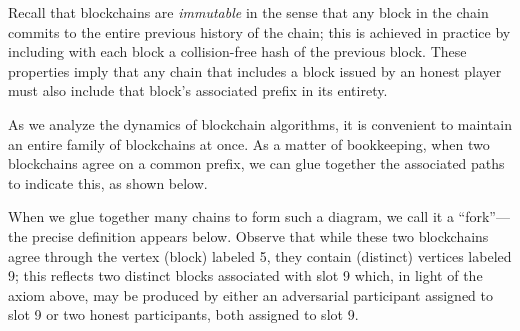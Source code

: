   Recall that blockchains are \emph{immutable} in the sense that any
  block in the chain commits to the entire previous history of the
  chain; this is achieved in practice by including with each block a
  collision-free hash of the previous block. These properties imply that
  any chain that includes a block issued by an honest player 
  must also include that block's associated prefix in its entirety.

  As we analyze the dynamics of blockchain algorithms, it is convenient
  to maintain an entire family of blockchains at once. As a matter of
  bookkeeping, when two blockchains agree on a common prefix, we can
  glue together the associated paths to indicate this, as shown
  below.

    \begin{center}
      \end{center}
    When we glue together many chains to form such a diagram, we call it
    a ``fork''---the precise definition appears below. Observe that
    while these two blockchains agree through the vertex (block) labeled
    5, they contain (distinct) vertices labeled 9; this reflects two
    distinct blocks associated with slot 9 which, in light of the axiom
    above, 
    may be produced by either an adversarial participant assigned to slot 9 or 
    two honest participants, both assigned to slot 9.
    
